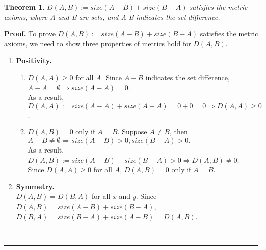 \documentclass{article}%
\newtheorem{theorem}{Theorem}
\newenvironment{proof}[1][Proof]{\textbf{#1.} }{\ \rule{0.5em}{0.5em}}
\begin{document}
\begin{enumerate}
 
 \begin{theorem}
    $D(A,B) := size(A-B) + size(B-A)$ satisfies the metric axioms, where A and B are sets, and A-B indicates the set difference.
 \end{theorem}
 \begin{proof}
 To prove $D(A,B) := size(A-B) + size(B-A)$ satisfies the metric axioms, we need to show three properties of metrics hold for $D(A,B)$. \\
 \begin{enumerate}
\item \textbf{Positivity.} 
\begin{enumerate}
\item $D(A,A) \geq 0 $ for all $A$. Since $ A - B $ indicates the set difference, $A - A = \emptyset \Rightarrow size(A - A) = 0$.\\
 As a result, $D(A,A) := size(A-A) + size(A-A) = 0 + 0 = 0 \Rightarrow D(A,A) \geq 0$.
\item $D(A,B) = 0 $ only if $ A = B $. Suppose $A \neq B$, then $A-B \neq \emptyset \Rightarrow size(A-B) > 0, size(B-A) >0.$ \\
As a result, $D(A,B) := size(A-B) + size(B-A) > 0 \Rightarrow D(A,B) \neq 0$. \\
Since $D(A,A) \geq 0 $ for all $A$, $D(A,B) = 0 $ only if $ A = B $.
\end{enumerate}

\item \textbf{Symmetry.} \\
$ D(A,B) = D(B,A)  $ for all $ x $ and $ y $. Since $D(A,B) = size(A-B) + size(B-A)$, $D(B,A) = size(B-A) + size(A-B) = D(A,B)$.


\end{enumerate}
\end{proof}
\end{enumerate}
\end{document}
